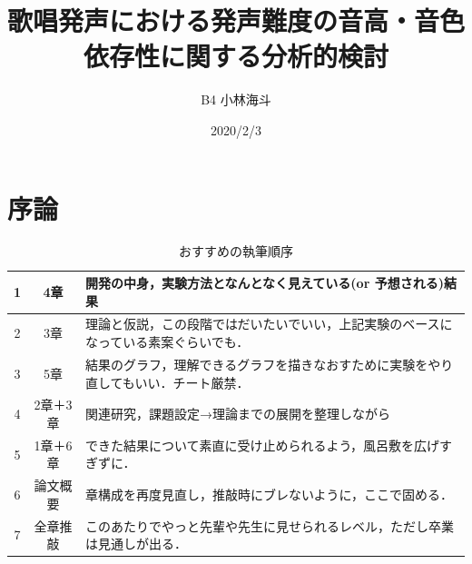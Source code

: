\documentclass[10ptj,a4j,dvipdfmx,uplatex, oneside, openany]{jsbook}%
\title{歌唱発声における発声難度の音高・音色依存性に関する分析的検討}
\author{B4 小林海斗}
\date{2020/2/3}
\begin{document}

\chapter{序論}

\begin{table}[h]
\caption{おすすめの執筆順序}%
\begin{center}
\begin{tabular}{|c|c|l|} %
\hline
1 & 4章 & 開発の中身，実験方法となんとなく見えている(or 予想される)結果 \\
\hline
2 & 3章 & 理論と仮説，この段階ではだいたいでいい，上記実験のベースになっている素案ぐらいでも． \\
\hline
3 & 5章 & 結果のグラフ，理解できるグラフを描きなおすために実験をやり直してもいい．チート厳禁． \\
\hline
4 & 2章＋3章 & 関連研究，課題設定→理論までの展開を整理しながら \\
\hline
5 & 1章＋6章 & できた結果について素直に受け止められるよう，風呂敷を広げすぎずに． \\
\hline
6 & 論文概要 & 章構成を再度見直し，推敲時にブレないように，ここで固める． \\
\hline
7 & 全章推敲 & このあたりでやっと先輩や先生に見せられるレベル，ただし卒業は見通しが出る． \\
\hline
\end{tabular}
\end{center}
\end{table}
\end{document}
